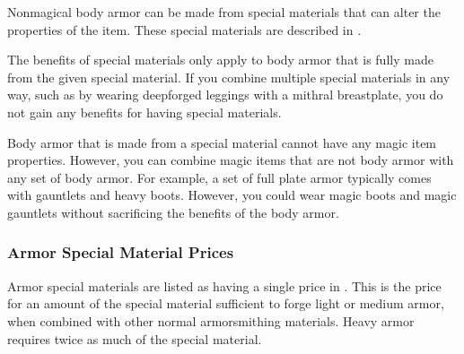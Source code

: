     Nonmagical body armor can be made from special materials that can alter the properties of the item.
    These special materials are described in .

    The benefits of special materials only apply to body armor that is fully made from the given special material.
    If you combine multiple special materials in any way, such as by wearing deepforged leggings with a mithral breastplate, you do not gain any benefits for having special materials.

    Body armor that is made from a special material cannot have any magic item properties.
    However, you can combine magic items that are not body armor with any set of body armor.
    For example, a set of full plate armor typically comes with gauntlets and heavy boots.
    However, you could wear magic boots and magic gauntlets without sacrificing the benefits of the body armor.

    \subsubsection{Armor Special Material Prices}
      Armor special materials are listed as having a single price in .
      This is the price for an amount of the special material sufficient to forge light or medium armor, when combined with other normal armorsmithing materials.
      Heavy armor requires twice as much of the special material.

